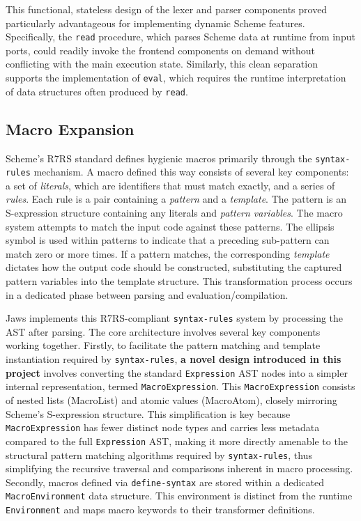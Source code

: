 \documentclass[final]{cmpreport_02}
\begin{document}
This functional, stateless design of the lexer and parser components proved particularly advantageous for implementing dynamic Scheme features. Specifically, the \texttt{read} procedure, which parses Scheme data at runtime from input ports, could readily invoke the frontend components on demand without conflicting with the main execution state. Similarly, this clean separation supports the implementation of \texttt{eval}, which requires the runtime interpretation of data structures often produced by \texttt{read}.


\subsection{Macro Expansion}

Scheme's R7RS standard defines hygienic macros primarily through the \linebreak\texttt{syntax-rules} mechanism. A macro defined this way consists of several key components: a set of \emph{literals}, which are identifiers that must match exactly, and a series of \emph{rules}. Each rule is a pair containing a \emph{pattern} and a \emph{template}. The pattern is an S-expression structure containing any literals and \emph{pattern variables}. The macro system attempts to match the input code against these patterns. The ellipsis symbol is used within patterns to indicate that a preceding sub-pattern can match zero or more times. If a pattern matches, the corresponding \emph{template} dictates how the output code should be constructed, substituting the captured pattern variables into the template structure. This transformation process occurs in a dedicated phase between parsing and evaluation/compilation.\newline

Jaws implements this R7RS-compliant \texttt{syntax-rules} system by processing the AST after parsing. The core architecture involves several key components working together. Firstly, to facilitate the pattern matching and template instantiation required by \linebreak\texttt{syntax-rules}, \textbf{a novel design introduced in this project} involves converting the standard \texttt{Expression} AST nodes into a simpler internal representation, termed \linebreak\texttt{MacroExpression}. This \texttt{MacroExpression} consists of nested lists (MacroList) and atomic values (MacroAtom), closely mirroring Scheme's S-expression structure. This simplification is key because \texttt{MacroExpression} has fewer distinct node types and carries less metadata compared to the full \texttt{Expression} AST, making it more directly amenable to the structural pattern matching algorithms required by \linebreak\texttt{syntax-rules}, thus simplifying the recursive traversal and comparisons inherent in macro processing. Secondly, macros defined via \texttt{define-syntax} are stored within a dedicated \texttt{MacroEnvironment} data structure. This environment is distinct from the runtime \texttt{Environment} and maps macro keywords to their transformer definitions.\newline
\end{document}
